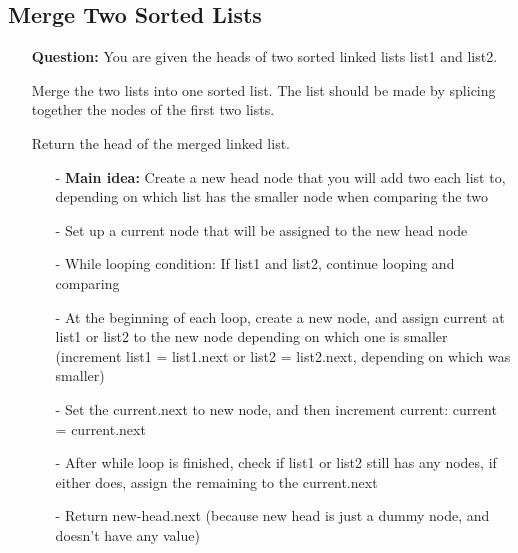 \documentclass[12pt]{article}
\begin{document}
\subsection{Merge Two Sorted Lists}
\begin{enumerate}
  \item[] \textbf{Question:} You are given the heads of two sorted linked lists list1 and list2.

Merge the two lists into one sorted list. The list should be made by splicing together the nodes of the first two lists.

Return the head of the merged linked list.

    \begin{enumerate}
      \item[-] \textbf{Main idea:} Create a new head node that you will add two each list to, depending on which list has the smaller node when comparing the two
      \item[-] Set up a current node that will be assigned to the new head node
      \item[-] While looping condition: If list1 and list2, continue looping and comparing 
      \item[-] At the beginning of each loop, create a new node, and assign current at list1 or list2 to the new node depending on which one is smaller (increment list1 = list1.next or list2 = list2.next, depending on which was smaller)
      \item[-] Set the current.next to new node, and then increment current: current = current.next 
      \item[-] After while loop is finished, check if list1 or list2 still has any nodes, if either does, assign the remaining to the current.next
      \item[-] Return new-head.next (because new head is just a dummy node, and doesn't have any value)

    \end{enumerate}
\end{enumerate}
\end{document}
